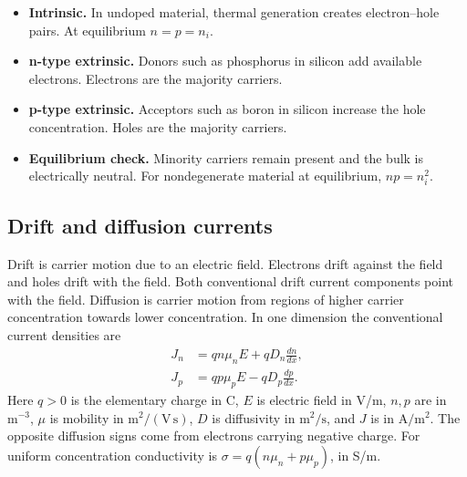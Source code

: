 \documentclass[12pt,a4paper]{article}
\begin{document}
\begin{tcolorbox}[tikzbox,title={Energy-band comparison},unbreakable]
\centering
{}
\end{tcolorbox}

\begin{itemize}[leftmargin=*, itemsep=3pt, topsep=4pt]
  \item \textbf{Intrinsic.} In undoped material, thermal generation creates electron--hole pairs. At equilibrium \(n=p=n_i\).
  \item \textbf{n-type extrinsic.} Donors such as phosphorus in silicon add available electrons. Electrons are the majority carriers.
  \item \textbf{p-type extrinsic.} Acceptors such as boron in silicon increase the hole concentration. Holes are the majority carriers.
  \item \textbf{Equilibrium check.} Minority carriers remain present and the bulk is electrically neutral. For nondegenerate material at equilibrium, \(np=n_i^2\).
\end{itemize}

\subsection{Drift and diffusion currents}
Drift is carrier motion due to an electric field. Electrons drift against the field and holes drift with the field. Both conventional drift current components point with the field. Diffusion is carrier motion from regions of higher carrier concentration towards lower concentration. In one dimension the conventional current densities are
\[
\begin{aligned}
J_n &= q n\mu_n E+q D_n \frac{dn}{dx},\\
J_p &= q p\mu_p E-q D_p \frac{dp}{dx}.
\end{aligned}
\]
Here \(q>0\) is the elementary charge in C, \(E\) is electric field in V/m, \(n,p\) are in \(\mathrm{m^{-3}}\), \(\mu\) is mobility in \(\mathrm{m^2/(V\,s)}\), \(D\) is diffusivity in \(\mathrm{m^2/s}\), and \(J\) is in \(\mathrm{A/m^2}\). The opposite diffusion signs come from electrons carrying negative charge. For uniform concentration conductivity is \(\sigma=q(n\mu_n+p\mu_p)\), in S/m.
\end{document}
